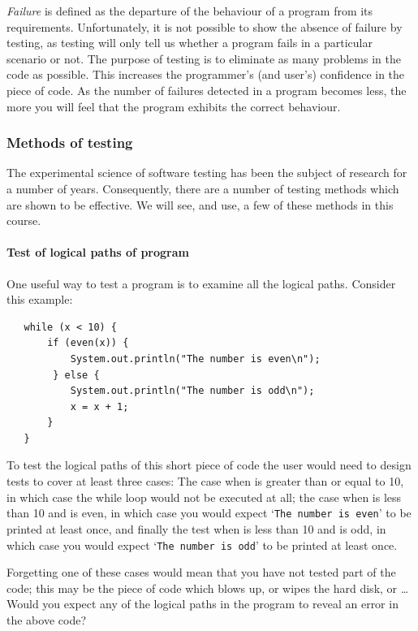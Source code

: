 {\em Failure} is defined as the 
departure of the behaviour of a program from its requirements. Unfortunately,
it is not possible to show the absence of failure by testing, as testing 
will only tell us whether a program fails in a particular scenario or not.
The purpose of testing is to eliminate as many problems in the code as 
possible. This  
increases the programmer's (and user's) confidence in the piece of code. As
the number of failures detected in a program becomes less, the more you will 
feel that the program exhibits the correct behaviour.      

\subsubsection{Methods of testing}

The experimental science of software testing has been the subject of research
for a number of years. Consequently, there are a number of testing methods
which are shown to be effective. We will see, and use, a few of these methods
in this course. 

\paragraph{Test of logical paths of program} One useful way to test a
program is to examine all the logical paths. Consider this example:

\begin{verbatim}
   while (x < 10) {
       if (even(x)) {
           System.out.println("The number is even\n");
        } else {
           System.out.println("The number is odd\n");
           x = x + 1;
       }
   }
\end{verbatim}

To test the logical paths of this short piece of code the user would need 
to design tests to cover at least three cases: The case when  is 
greater than or equal to 10, in which case the while loop would not be
executed at all; the case when  is less than 10 and is even, in which 
case you would expect `{\tt The number is even}' to be printed at least once, 
and finally the test when  is less than 10 and is odd, in which case 
you would expect `{\tt The number is odd}' to be printed at least once.


Forgetting one of these cases would mean that you have not tested part of the 
code; this may be the piece of code which blows up, or
wipes the hard disk, or \ldots Would you expect any of the logical paths
in the program to reveal an error in the above code?

